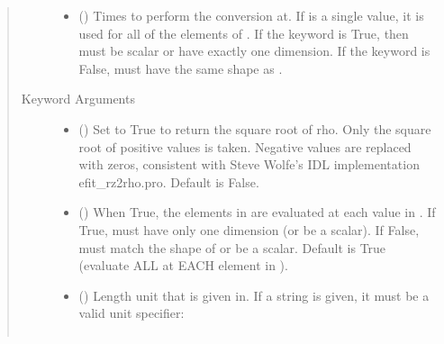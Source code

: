 \documentclass[letterpaper,10pt,english]{sphinxmanual}
\begin{document}
\begin{fulllineitems}
\begin{fulllineitems}
\begin{quote}
\begin{description}
\begin{itemize}
\item {} 
 () \textendash{} Times to perform the conversion at.
If  is a single value, it is used for all of the elements of
. If the  keyword is True, then  must be scalar
or have exactly one dimension. If the  keyword is False,
 must have the same shape as .

\end{itemize}

\item[{Keyword Arguments}] \leavevmode\begin{itemize}
\item {} 
 () \textendash{} Set to True to return the square root of rho.
Only the square root of positive values is taken. Negative
values are replaced with zeros, consistent with Steve Wolfe’s
IDL implementation efit\_rz2rho.pro. Default is False.

\item {} 
 () \textendash{} When True, the elements in  are evaluated
at each value in . If True,  must have only one dimension
(or be a scalar). If False,  must match the shape of 
or be a scalar. Default is True (evaluate ALL  at EACH
element in ).

\item {} 
 () \textendash{} 
Length unit that  is given in.
If a string is given, it must be a valid unit specifier:
\begin{quote}


\begin{savenotes}\sphinxattablestart
\centering
\begin{tabulary}{\linewidth}[t]{|T|T|}
\hline


\end{tabulary}
\end{savenotes}
\end{quote}
\end{itemize}
\end{description}
\end{quote}
\end{fulllineitems}
\end{fulllineitems}
\end{document}

